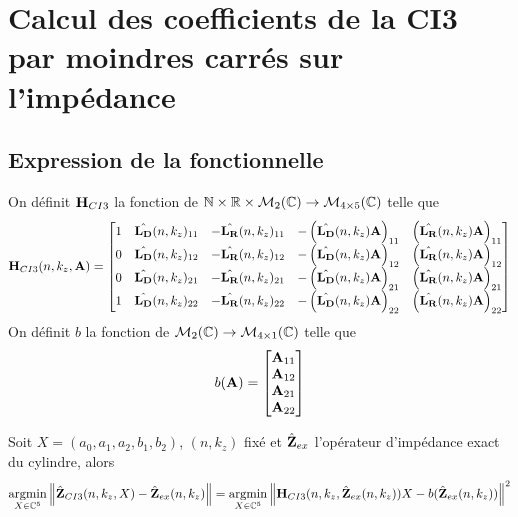 \section{Calcul des coefficients de la CI3 par moindres carrés sur l'impédance}

  \subsection{Expression de la fonctionnelle}

    \begin{defn}
      On définit \(\mathbf{H}_{CI3}\) la fonction de \(\mathbb N \times \mathbb R \times \mathcal{M}_2(\mathbb C) \rightarrow \mathcal{M}_{4\times5}(\mathbb C)\) telle que
      \begin{equation*}
        \mathbf{H}_{CI3}(n,k_z,\mathbf{A}) = \begin{bmatrix}
        1 & \hat{\mathbf{L_D}}(n,k_z)_{11} & -\hat{\mathbf{L_R}}(n,k_z)_{11} & -\left(\hat{\mathbf{L_D}}(n,k_z){\mathbf{A}}\right)_{11} & \left(\hat{\mathbf{L_R}}(n,k_z){\mathbf{A}}\right)_{11}
        \\
        0 & \hat{\mathbf{L_D}}(n,k_z)_{12} & -\hat{\mathbf{L_R}}(n,k_z)_{12} & -\left(\hat{\mathbf{L_D}}(n,k_z){\mathbf{A}}\right)_{12} & \left(\hat{\mathbf{L_R}}(n,k_z){\mathbf{A}}\right)_{12}
        \\
        0 & \hat{\mathbf{L_D}}(n,k_z)_{21} & -\hat{\mathbf{L_R}}(n,k_z)_{21} & -\left(\hat{\mathbf{L_D}}(n,k_z){\mathbf{A}}\right)_{21} & \left(\hat{\mathbf{L_R}}(n,k_z){\mathbf{A}}\right)_{21}
        \\
        1 & \hat{\mathbf{L_D}}(n,k_z)_{22} & -\hat{\mathbf{L_R}}(n,k_z)_{22} & -\left(\hat{\mathbf{L_D}}(n,k_z){\mathbf{A}}\right)_{22} & \left(\hat{\mathbf{L_R}}(n,k_z){\mathbf{A}}\right)_{22}
        \end{bmatrix}
      \end{equation*}
      On définit \(b\) la fonction de \(\mathcal{M}_2(\mathbb C) \rightarrow \mathcal{M}_{4\times1}(\mathbb C)\) telle que
      \begin{equation*}
        b(\mathbf{A}) = \begin{bmatrix}
        {\mathbf{A}}_{11}
        \\
        {\mathbf{A}}_{12}
        \\
        {\mathbf{A}}_{21}
        \\
        {\mathbf{A}}_{22}
        \end{bmatrix}
      \end{equation*}
    \end{defn}

    \begin{prop}
      Soit \(X = (a_0,a_1,a_2,b_1,b_2)\), \((n,k_z)\) fixé et \(\hat{\mathbf{Z}}_{ex}\) l'opérateur d'impédance exact du cylindre, alors
      \begin{equation*}
        {\underset{X\in\mathbb C^5}{\operatorname{argmin}}} \left\lVert\hat{\mathbf{Z}}_{CI3}(n,k_z,X) - \hat{\mathbf{Z}}_{ex}(n,k_z)\right\rVert = {\underset{X\in\mathbb C^5}{\operatorname{argmin}}} \left\lVert\mathbf{H}_{CI3}(n,k_z,\hat{\mathbf{Z}}_{ex}(n,k_z))X - b(\hat{\mathbf{Z}}_{ex}(n,k_z))\right\rVert^2
      \end{equation*}
    \end{prop}

